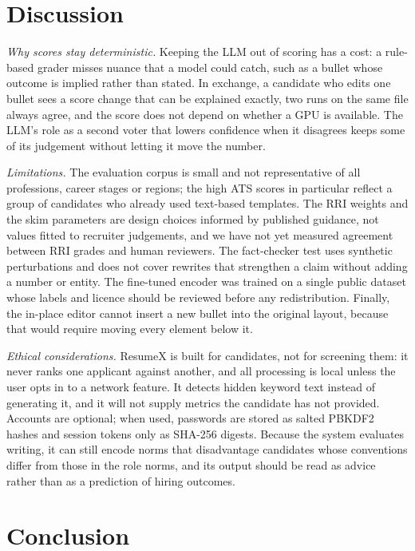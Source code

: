 \documentclass[3p,times,procedia]{elsarticle}
\begin{document}
\section{Discussion}
\label{sec:discussion}

\textit{Why scores stay deterministic.} Keeping the LLM out of scoring has a cost: a rule-based grader misses nuance that a model could catch, such as a bullet whose outcome is implied rather than stated. In exchange, a candidate who edits one bullet sees a score change that can be explained exactly, two runs on the same file always agree, and the score does not depend on whether a GPU is available. The LLM's role as a second voter that lowers confidence when it disagrees keeps some of its judgement without letting it move the number.

\textit{Limitations.} The evaluation corpus is small and not representative of all professions, career stages or regions; the high ATS scores in particular reflect a group of candidates who already used text-based templates. The RRI weights and the skim parameters are design choices informed by published guidance, not values fitted to recruiter judgements, and we have not yet measured agreement between RRI grades and human reviewers. The fact-checker test uses synthetic perturbations and does not cover rewrites that strengthen a claim without adding a number or entity. The fine-tuned encoder was trained on a single public dataset whose labels and licence should be reviewed before any redistribution. Finally, the in-place editor cannot insert a new bullet into the original layout, because that would require moving every element below it.

\textit{Ethical considerations.} ResumeX is built for candidates, not for screening them: it never ranks one applicant against another, and all processing is local unless the user opts in to a network feature. It detects hidden keyword text instead of generating it, and it will not supply metrics the candidate has not provided. Accounts are optional; when used, passwords are stored as salted PBKDF2 hashes and session tokens only as SHA-256 digests. Because the system evaluates writing, it can still encode norms that disadvantage candidates whose conventions differ from those in the role norms, and its output should be read as advice rather than as a prediction of hiring outcomes.

\section{Conclusion}
\label{sec:conclusion}
\end{document}
